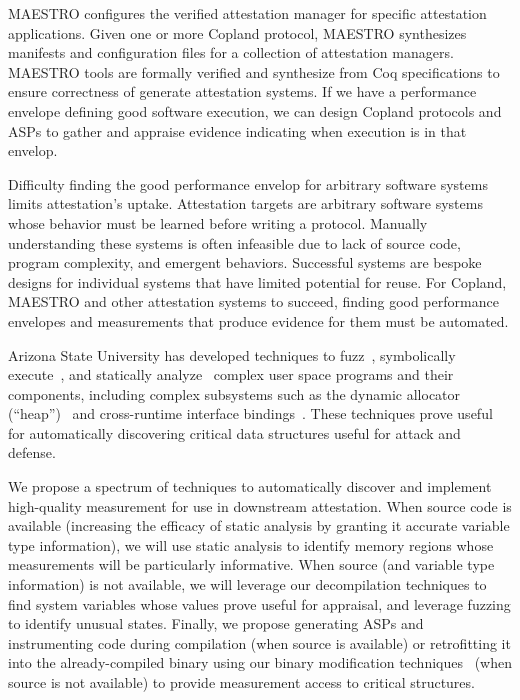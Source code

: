 \documentclass[runningheads]{llncs}
\begin{document}
MAESTRO configures the verified attestation manager for specific attestation
applications.  Given one or more Copland protocol, MAESTRO synthesizes manifests
and configuration files for a collection of attestation managers. MAESTRO tools
are formally verified and synthesize from Coq specifications to ensure
correctness of generate attestation systems.  If we have a performance envelope
defining good software execution, we can design Copland protocols and ASPs to
gather and appraise evidence indicating  when execution is in that envelop.

Difficulty finding the good performance envelop for arbitrary software systems
limits attestation's uptake.  Attestation targets are arbitrary software systems
whose behavior must be learned before writing a protocol.  Manually
understanding these systems is often infeasible due to lack of source code,
program complexity, and emergent behaviors.  Successful systems are bespoke
designs for individual systems that have limited potential for reuse.  For
Copland, MAESTRO and other attestation systems to succeed, finding good
performance envelopes and measurements that produce evidence for them must be
automated.

Arizona State University has developed
techniques to fuzz~\citep{trickel2022toss,salls2020exploring,peng2018t}, symbolically execute~\citep{stephens2016driller,shoshitaishvili2016sok}, and statically analyze~\citep{das2022hybrid,vadayath2022arbiter} complex user space programs and their components, including complex subsystems such as the dynamic allocator (``heap'')~\citep{eckert2018heaphopper} and cross-runtime interface bindings~\citep{dinh2021favocado}.
These techniques prove useful for automatically discovering critical data structures useful for attack and defense.

We propose a spectrum of techniques to automatically discover and implement
high-quality measurement for use in downstream attestation.  When source code is
available (increasing the efficacy of static analysis by granting it accurate
variable type information), we will use static analysis to identify memory
regions whose measurements will be particularly informative.  When source (and
variable type information) is not available, we will leverage our decompilation
techniques to find system variables whose values prove useful for appraisal, and
leverage fuzzing to identify unusual states.  Finally, we propose generating
ASPs and instrumenting code during compilation (when source is available) or
retrofitting it into the already-compiled binary using our binary modification
techniques~\citep{wang2017ramblr} (when source is not available) to provide
measurement access to critical structures.
\end{document}
